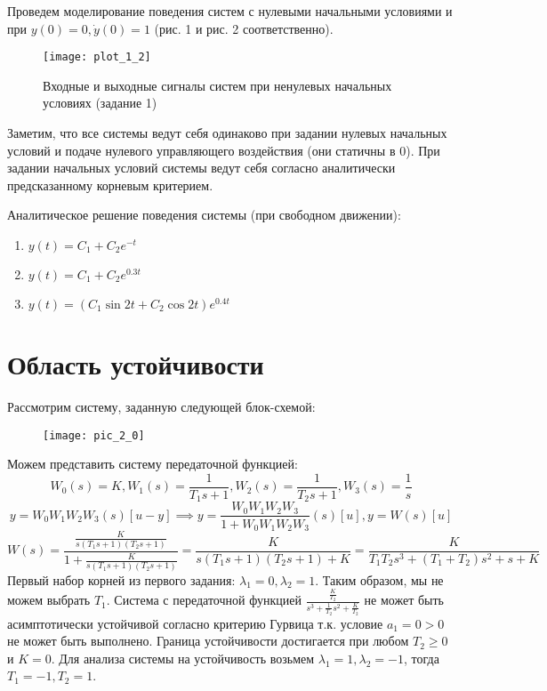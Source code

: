  Проведем моделирование поведения систем с нулевыми начальными условиями и при $y(0)=0, \dot y (0) = 1$ 
 (рис. 1 и рис. 2 соответственно).
 

 \begin{figure}[h]
    \centering
    \texttt{[image: plot\_1\_2]}
    \caption{\label{fig:The-caption-1}Входные и выходные сигналы систем при ненулевых начальных условиях (задание 1)}
\end{figure}

Заметим, что все системы ведут себя одинаково при задании нулевых начальных условий 
и подаче нулевого управляющего воздействия (они статичны в 0). При задании начальных условий системы
ведут себя согласно аналитически предсказанному корневым критерием.

Аналитическое решение поведения системы (при свободном движении):
\begin{enumerate}
    \item $y(t) = C_1 + C_2 e^{-t}$
    \item $y(t) = C_1 + C_2 e^{0.3t}$
    \item $y(t) = (C_1 \sin{2t} + C_2 \cos{2t}) e^{0.4t}$
\end{enumerate}

\pagebreak

\section{Область устойчивости}
Рассмотрим систему, заданную следующей блок-схемой:
\begin{figure}[h]
    \centering
    \texttt{[image: pic\_2\_0]}
\end{figure}

Можем представить систему передаточной функцией:
\begin{equation*}
    W_0(s) = K, W_1(s) = \frac{1}{T_1 s + 1}, W_2(s) = \frac{1}{T_2 s + 1}, W_3(s)=\frac{1}{s} 
\end{equation*}
\begin{equation*}
    y = W_0W_1W_2W_3(s)[u - y] \implies y = \frac{W_0W_1W_2W_3}{1 + W_0W_1W_2W_3}(s)[u], y = W(s)[u]
\end{equation*}
\begin{equation}
    W(s)=\frac{\frac{K}{s(T_1 s + 1)(T_2 s + 1)}}{1 + \frac{K}{s(T_1 s + 1)(T_2 s + 1)}}=
    \frac{K}{s(T_1 s + 1)(T_2 s + 1) + K}=\frac{K}{T_1 T_2 s^3 + (T_1 + T_2) s^2 + s + K}
\end{equation}
Первый набор корней из первого задания: $\lambda_1 = 0, \lambda_2 = 1$. Таким образом, мы 
не можем выбрать $T_1$. Система с передаточной функцией $\frac{\frac{K}{T_2}}{s^3 + \frac{1}{T_2}s^2 + \frac{K}{T_2}}$
не может быть асимптотически устойчивой согласно критерию Гурвица т.к. условие $a_1 = 0 > 0$ не может быть выполнено.
Граница устойчивости достигается при любом $T_2 \ge 0$ и $K=0$.
Для анализа системы на устойчивость возьмем $\lambda_1 = 1, \lambda_2 = -1$, тогда $T_1=-1, T_2=1$.


